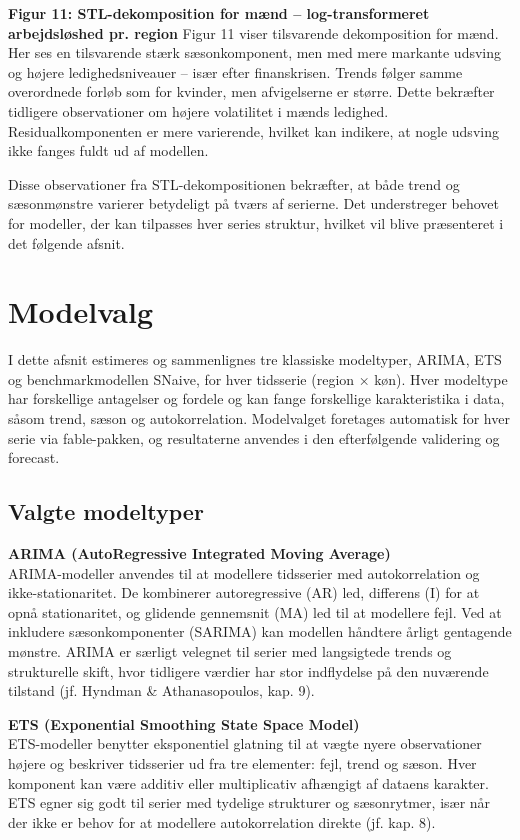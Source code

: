 \documentclass[
]{article}
\begin{document}
\textbf{Figur 11: STL-dekomposition for mænd -- log-transformeret
arbejdsløshed pr. region} Figur 11 viser tilsvarende dekomposition for
mænd. Her ses en tilsvarende stærk sæsonkomponent, men med mere markante
udsving og højere ledighedsniveauer -- især efter finanskrisen. Trends
følger samme overordnede forløb som for kvinder, men afvigelserne er
større. Dette bekræfter tidligere observationer om højere volatilitet i
mænds ledighed. Residualkomponenten er mere varierende, hvilket kan
indikere, at nogle udsving ikke fanges fuldt ud af modellen.

Disse observationer fra STL-dekompositionen bekræfter, at både trend og
sæsonmønstre varierer betydeligt på tværs af serierne. Det understreger
behovet for modeller, der kan tilpasses hver series struktur, hvilket
vil blive præsenteret i det følgende afsnit.

\section{Modelvalg}\label{modelvalg}

I dette afsnit estimeres og sammenlignes tre klassiske modeltyper,
ARIMA, ETS og benchmarkmodellen SNaive, for hver tidsserie (region ×
køn). Hver modeltype har forskellige antagelser og fordele og kan fange
forskellige karakteristika i data, såsom trend, sæson og
autokorrelation. Modelvalget foretages automatisk for hver serie via
fable-pakken, og resultaterne anvendes i den efterfølgende validering og
forecast.

\subsection{Valgte modeltyper}\label{valgte-modeltyper}

\textbf{ARIMA (AutoRegressive Integrated Moving Average)}\\
ARIMA-modeller anvendes til at modellere tidsserier med autokorrelation
og ikke-stationaritet. De kombinerer autoregressive (AR) led, differens
(I) for at opnå stationaritet, og glidende gennemsnit (MA) led til at
modellere fejl. Ved at inkludere sæsonkomponenter (SARIMA) kan modellen
håndtere årligt gentagende mønstre. ARIMA er særligt velegnet til serier
med langsigtede trends og strukturelle skift, hvor tidligere værdier har
stor indflydelse på den nuværende tilstand (jf. Hyndman \&
Athanasopoulos, kap. 9).

\textbf{ETS (Exponential Smoothing State Space Model)}\\
ETS-modeller benytter eksponentiel glatning til at vægte nyere
observationer højere og beskriver tidsserier ud fra tre elementer: fejl,
trend og sæson. Hver komponent kan være additiv eller multiplicativ
afhængigt af dataens karakter. ETS egner sig godt til serier med
tydelige strukturer og sæsonrytmer, især når der ikke er behov for at
modellere autokorrelation direkte (jf. kap. 8).
\end{document}
